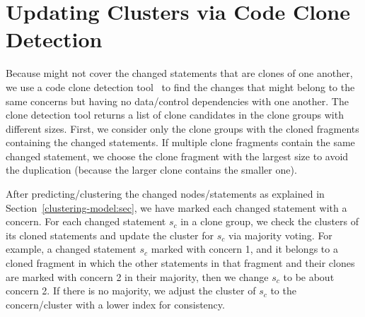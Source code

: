 \section{Updating Clusters via Code Clone Detection}
\label{sec:clone}

Because {\mvpdg} might not cover the changed statements that are
clones of one another, we use a code clone detection
tool~\cite{svajlenko2017fast} to find the changes that might belong to
the same concerns but having no data/control dependencies with one
another. The clone detection tool returns a list of clone candidates
in the clone groups with different sizes. First, we consider only the
clone groups with the cloned fragments containing the changed
statements. If multiple clone fragments contain the same changed
statement, we choose the clone fragment with the largest size to avoid
the duplication (because the larger clone contains the smaller one).

After predicting/clustering the changed nodes/statements as explained
in Section~\ref{clustering-model:sec}, we have marked each changed
statement with a concern. For each changed statement $s_c$ in a clone
group, we check the clusters of its cloned statements and update the
cluster for $s_c$ via majority voting. For example, a changed
statement $s_c$ marked with concern 1, and it belongs to a cloned
fragment in which the other statements in that fragment and their
clones are marked with concern 2 in their majority, then we change $s_c$
to be about concern 2. If there is no majority, we adjust the cluster
of $s_c$ to the concern/cluster with a lower index for consistency.



